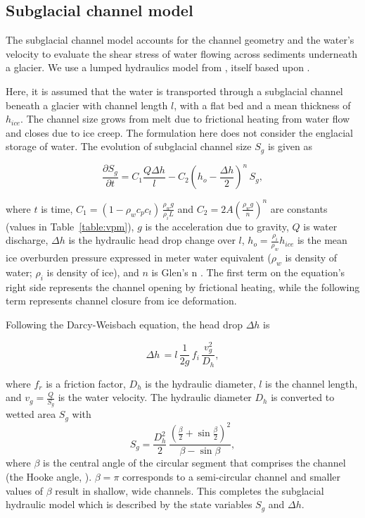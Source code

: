 \documentclass[tc, manuscript]{copernicus}
\begin{document}
\subsection{Subglacial channel  model}
\label{sect:sub_mode}

The subglacial channel model accounts for the channel geometry and the water's velocity to evaluate the shear stress of water flowing across sediments underneath a glacier.
We use a lumped hydraulics model from \citet{werder2010b}, itself based upon  \citet{clarke1996}.

Here, it is assumed that the water is transported through a subglacial channel \citep[Figure~\ref{fig:cartoon}; ][]{rothlisberger1972} beneath a glacier with channel length $l$, with a flat bed and a mean thickness of $h_{ice}$.
The channel size grows from melt due to frictional heating from water flow and closes due to ice creep.
The formulation here does not consider the englacial storage of water.
The evolution of subglacial channel size $S_g$ is given as
\begin{linenomath*}
  \begin{equation}
    \label{eq:dS_dt}
    \frac{\partial S_g}{\partial t} = C_1 \frac{Q \Delta h}{l} - C_2 \left(h_{o}-\frac{\Delta h}{2}\right)^n\,S_g,
  \end{equation}
\end{linenomath*}
\noindent where $t$ is time, $C_1= (1-\rho_wc_pc_t)\,\frac{\rho_wg}{\rho_iL}$ and $C_2=2A(\frac{\rho_wg}{n})^n$ are constants (values in Table~\ref{table:vpm}), $g$ is the acceleration due to gravity, $Q$ is water discharge, $\Delta h$ is the hydraulic head drop change over $l$, $h_{o}= \frac{\rho_i}{\rho_w} h_{ice}$ is the mean ice overburden pressure expressed in meter water equivalent ($\rho_w$ is density of water; $\rho_i$ is density of ice), and $n$ is Glen's n \citep[usually $n=3$; ][]{glen1955}.
The first term on the equation's right side represents the channel opening by frictional heating, while the following term represents channel closure from ice deformation.


Following the Darcy-Weisbach equation, the head drop $\Delta h$ is
\begin{linenomath*}
  \begin{equation}
    \label{eq:dh}
    \Delta h \,  = l \,\frac{1}{2g} \,f_i\,\frac{v_{g}^{2}}{D_h},
  \end{equation}
\end{linenomath*}
\noindent where $f_r$ is a friction factor, $D_h$ is the hydraulic diameter, $l$ is the channel length, and $v_g=\frac{Q}{S_g}$ is the water velocity.
% 
The hydraulic diameter $D_h$ is converted to wetted area $S_g$ with
\begin{equation}
  \label{eq:Dh2S}
  S_g= \frac{D_h^2}{2}\,\frac{(\frac{\beta}{2}+\sin \frac{\beta}{2})^2}{\beta - \sin \beta},
\end{equation}
where $\beta$ is the central angle of the circular segment that comprises the channel (the Hooke angle, \citet{hooke1990}). $\beta =\pi$ corresponds to a semi-circular channel and smaller values of $\beta$ result in shallow, wide channels.
This completes the subglacial hydraulic model which is described by the state variables $S_g$ and $\Delta h$.
\end{document}
